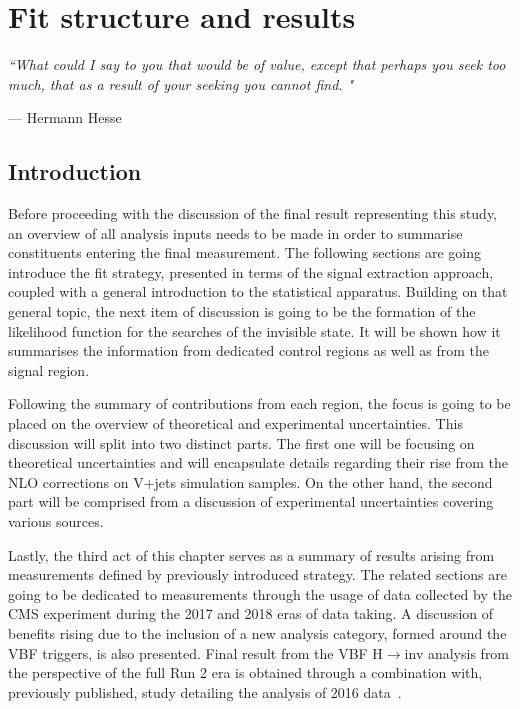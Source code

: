\chapter{Fit structure and results}
\label{ch:fit}
\epigraph{\itshape``What could I say to you that would be of value, except that perhaps you seek too much, that as a result of your seeking you cannot find. "}{--- \textup{Hermann Hesse}}

\section{Introduction}
\hspace{10pt} Before proceeding with the discussion of the final result representing this study, an overview of all analysis inputs needs to be made in order to summarise constituents entering the final measurement. The following sections are going introduce the fit strategy, presented in terms of the signal extraction approach, coupled with a general introduction to the statistical apparatus. Building on that general topic, the next item of discussion is going to be the formation of the likelihood function for the searches of the invisible state. It will be shown how it summarises the information from dedicated control regions as well as from the signal region.

\hspace{10pt} Following the summary of contributions from each region, the focus is going to be placed on the overview of theoretical and experimental uncertainties. This discussion will split into two distinct parts. The first one will be focusing on theoretical uncertainties and will encapsulate details regarding their rise from the NLO corrections on V+jets simulation samples. On the other hand, the second part will be comprised from a discussion of experimental uncertainties covering various sources.


\hspace{10pt} Lastly, the third act of this chapter serves as a summary of results arising from measurements defined by previously introduced strategy. The related sections are going to be dedicated to measurements through the usage of data collected by the CMS experiment during the 2017 and 2018 eras of data taking. A discussion of benefits rising due to the inclusion of a new analysis category, formed around the VBF triggers, is also presented. Final result from the VBF H$\rightarrow$inv analysis from the perspective of the full Run 2 era is obtained through a combination with, previously published, study detailing the analysis of 2016 data~\cite{paper:HIG_17_023}.
